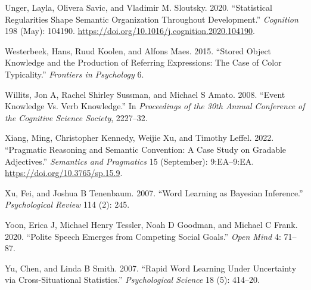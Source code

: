 \documentclass{ucetd}
\newlength{\cslhangindent}
\newenvironment{cslreferences}%
{\setlength{\parindent}{0pt}%
\everypar{\setlength{\hangindent}{\cslhangindent}}\ignorespaces}%
{\par}
\begin{document}
\begin{cslreferences}
\leavevmode\hypertarget{ref-unger_statistical_2020}{}%
Unger, Layla, Olivera Savic, and Vladimir M. Sloutsky. 2020.
``Statistical Regularities Shape Semantic Organization Throughout
Development.'' \emph{Cognition} 198 (May): 104190.
\url{https://doi.org/10.1016/j.cognition.2020.104190}.

\leavevmode\hypertarget{ref-westerbeek2015}{}%
Westerbeek, Hans, Ruud Koolen, and Alfons Maes. 2015. ``Stored Object
Knowledge and the Production of Referring Expressions: The Case of Color
Typicality.'' \emph{Frontiers in Psychology} 6.

\leavevmode\hypertarget{ref-willits2008}{}%
Willits, Jon A, Rachel Shirley Sussman, and Michael S Amato. 2008.
``Event Knowledge Vs. Verb Knowledge.'' In \emph{Proceedings of the 30th
Annual Conference of the Cognitive Science Society}, 2227--32.

\leavevmode\hypertarget{ref-xiang_pragmatic_2022}{}%
Xiang, Ming, Christopher Kennedy, Weijie Xu, and Timothy Leffel. 2022.
``Pragmatic Reasoning and Semantic Convention: A Case Study on Gradable
Adjectives.'' \emph{Semantics and Pragmatics} 15 (September):
9:EA--9:EA. \url{https://doi.org/10.3765/sp.15.9}.

\leavevmode\hypertarget{ref-xu2007}{}%
Xu, Fei, and Joshua B Tenenbaum. 2007. ``Word Learning as Bayesian
Inference.'' \emph{Psychological Review} 114 (2): 245.

\leavevmode\hypertarget{ref-yoon2020}{}%
Yoon, Erica J, Michael Henry Tessler, Noah D Goodman, and Michael C
Frank. 2020. ``Polite Speech Emerges from Competing Social Goals.''
\emph{Open Mind} 4: 71--87.

\leavevmode\hypertarget{ref-yu2007}{}%
Yu, Chen, and Linda B Smith. 2007. ``Rapid Word Learning Under
Uncertainty via Cross-Situational Statistics.'' \emph{Psychological
Science} 18 (5): 414--20.
\end{cslreferences}


\makebibliography

%
%
\end{document}
